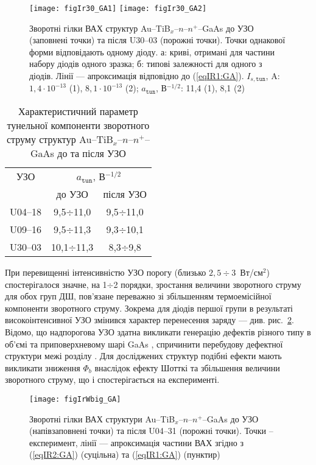 \begin{figure}
\center
\texttt{[image: figIr30\_GA1]} \hfill
\texttt{[image: figIr30\_GA2]}
\caption{\label{figIr30_GA}
Зворотні гілки ВАХ структур Au--TiB$_x$--$n$--$n^+$--GaAs
до УЗО (заповнені точки)
та після U30--03 (порожні точки).
Точки однакової форми відповідають одному діоду.
а: криві, отримані для частини набору діодів одного зразка;
б: типові залежності для одного з діодів.
Лінії --- апроксимація відповідно до (\ref{eqIR1:GA}).
$I_{s,\mathtt{tun}}$, A: $1,4\cdot10^{-13}$ (1), $8,1\cdot10^{-13}$ (2);
$a_\mathtt{tun}$, В$^{-1/2}$: 11,4 (1), 8,1 (2)
}%
\end{figure}

\begin{table}
\caption{\label{tabUS_GaAs}Характеристичний параметр тунельної компоненти
зворотного струму структур Au--TiB$_x$--$n$--$n^+$--GaAs до та після УЗО
}
\center
\begin{tabular}{|c|c|c|}
\hline
УЗО&\multicolumn{2}{c|}{$a_\mathtt{tun}$, В$^{-1/2}$}\\ \cline{2-3}
& до УЗО & після УЗО \\
\hline
U04--18&9,5$\div$11,0&9,5$\div$11,0\\ \hline
U09--16&9,5$\div$11,3&9,3$\div$10,1\\ \hline
U30--03&10,1$\div$11,3&8,3$\div$9,8\\ \hline
\end{tabular}
\end{table}


При перевищенні інтенсивністю  УЗО порогу (близько $2,5\div3$~Вт/см$^2$) спостерігалося значне, на 1$\div$2 порядки,
зростання величини зворотного струму для обох груп ДШ, пов'язане переважно зі збільшенням термоемісійної компоненти зворотного струму.
Зокрема для діодів першої групи в результаті високоінтенсивної УЗО
змінився характер перенесення заряду --- див. рис.~\ref{figIrWbig_GA}.
Відомо, що надпорогова УЗО здатна викликати генерацію дефектів різного типу в об’ємі та приповерхневому шарі GaAs \cite{Zaver},
спричинити перебудову дефектної структури межі розділу \cite{Parchinskii2003r}.
Для досліджених структур подібні ефекти мають викликати зниження $\Phi_b$ внаслідок ефекту Шотткі та збільшення величини зворотного струму, що і спостерігається на експерименті.


\begin{figure}
\center
\texttt{[image: figIrWbig\_GA]}%
\caption{\label{figIrWbig_GA}
Зворотні гілки ВАХ структури Au--TiB$_x$--$n$--$n^+$--GaAs
до УЗО (напівзаповнені точки)
та після U04--31 (порожні точки).
Точки -- експеримент,
лінії --- апроксимація частини ВАХ згідно з (\ref{eqIR2:GA}) (суцільна) та (\ref{eqIR1:GA}) (пунктир)
}%
\end{figure}




